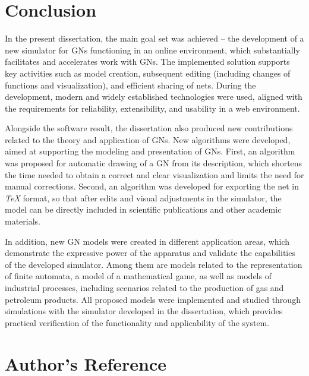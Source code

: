 	\section*{Conclusion}
	
	\hspace*{2.5em}In the present dissertation, the main goal set was achieved -- the development of a new simulator for GNs functioning in an online environment, which substantially facilitates and accelerates work with GNs. The implemented solution supports key activities such as model creation, subsequent editing (including changes of functions and visualization), and efficient sharing of nets. During the development, modern and widely established technologies were used, aligned with the requirements for reliability, extensibility, and usability in a web environment.
	
	Alongside the software result, the dissertation also produced new contributions related to the theory and application of GNs. New algorithms were developed, aimed at supporting the modeling and presentation of GNs. First, an algorithm was proposed for automatic drawing of a GN from its description, which shortens the time needed to obtain a correct and clear visualization and limits the need for manual corrections. Second, an algorithm was developed for exporting the net in \textit{TeX} format, so that after edits and visual adjustments in the simulator, the model can be directly included in scientific publications and other academic materials.
	
	In addition, new GN models were created in different application areas, which demonstrate the expressive power of the apparatus and validate the capabilities of the developed simulator. Among them are models related to the representation of finite automata, a model of a mathematical game, as well as models of industrial processes, including scenarios related to the production of gas and petroleum products. All proposed models were implemented and studied through simulations with the simulator developed in the dissertation, which provides practical verification of the functionality and applicability of the system.
	
	\clearpage
	\section*{Author's Reference}
	
